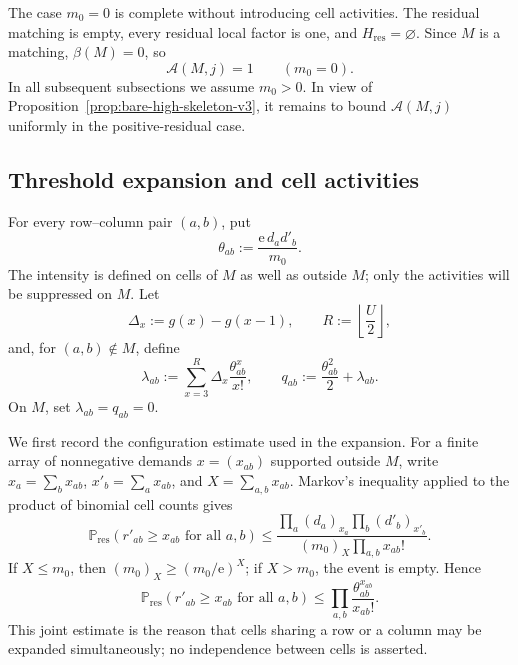 The case $m_0=0$ is complete without introducing cell activities. The residual
matching is empty, every residual local factor is one, and
$H_{\mathrm{res}}=\varnothing$. Since $M$ is a matching,
$\beta(M)=0$, so
\begin{equation}
  \mathcal A(M,j)=1
  \qquad(m_0=0).
  \label{eq:zero-residual-attachment-v3}
\end{equation}
In all subsequent subsections we assume $m_0>0$. In view of
Proposition~\ref{prop:bare-high-skeleton-v3}, it remains to bound
$\mathcal A(M,j)$ uniformly in the positive-residual case.

\subsection{Threshold expansion and cell activities}

For every row--column pair $(a,b)$, put
\begin{equation}
  \theta_{ab}:=
  \frac{\mathrm e\,d_ad'_b}{m_0}.
  \label{eq:theta-v3}
\end{equation}
The intensity is defined on cells of $M$ as well as outside $M$; only the
activities will be suppressed on $M$. Let
\[
  \Delta_x:=g(x)-g(x-1),
  \qquad
  R:=\left\lfloor\frac U2\right\rfloor,
\]
and, for $(a,b)\notin M$, define
\begin{equation}
  \lambda_{ab}
  :=
  \sum_{x=3}^{R}\Delta_x\frac{\theta_{ab}^x}{x!},
  \qquad
  q_{ab}
  :=
  \frac{\theta_{ab}^2}{2}+\lambda_{ab}.
  \label{eq:lambda-q-v3}
\end{equation}
On $M$, set $\lambda_{ab}=q_{ab}=0$.

We first record the configuration estimate used in the expansion. For a finite
array of nonnegative demands $x=(x_{ab})$ supported outside $M$, write
$x_a=\sum_bx_{ab}$, $x'_b=\sum_ax_{ab}$, and $X=\sum_{a,b}x_{ab}$. Markov's
inequality applied to the product of binomial cell counts gives
\[
  \mathbb P_{\mathrm{res}}(r'_{ab}\ge x_{ab}\text{ for all }a,b)
  \le
  \frac{
    \prod_a(d_a)_{x_a}\prod_b(d'_b)_{x'_b}
  }{
    (m_0)_X\prod_{a,b}x_{ab}!}.
\]
If $X\le m_0$, then $(m_0)_X\ge(m_0/\mathrm e)^X$; if $X>m_0$, the event is
empty. Hence
\begin{equation}
  \mathbb P_{\mathrm{res}}(r'_{ab}\ge x_{ab}\text{ for all }a,b)
  \le
  \prod_{a,b}\frac{\theta_{ab}^{x_{ab}}}{x_{ab}!}.
  \label{eq:prescribed-cell-residual-v3}
\end{equation}
This joint estimate is the reason that cells sharing a row or a column may be
expanded simultaneously; no independence between cells is asserted.

